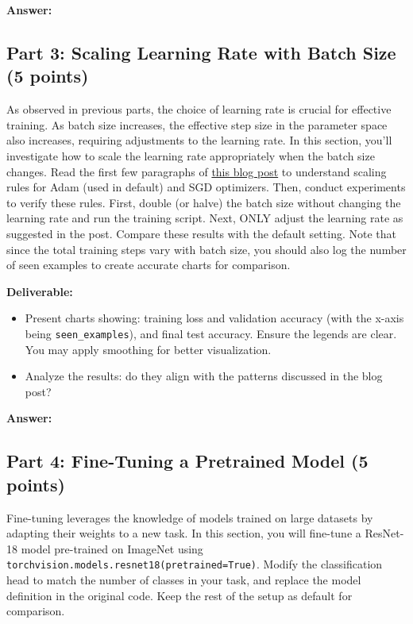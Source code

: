 \documentclass[11pt, oneside]{article}   	%
\begin{document}
\textbf{Answer:} \\



\subsection*{Part 3: Scaling Learning Rate with Batch Size (5 points)}

As observed in previous parts, the choice of learning rate is crucial for effective training. As batch size increases, the effective step size in the parameter space also increases, requiring adjustments to the learning rate. In this section, you'll investigate how to scale the learning rate appropriately when the batch size changes. Read the first few paragraphs of \href{https://www.cs.princeton.edu/~smalladi/blog/2024/01/22/SDEs-ScalingRules/}{this blog post} to understand scaling rules for Adam (used in default) and SGD optimizers. Then, conduct experiments to verify these rules. First, double (or halve) the batch size without changing the learning rate and run the training script. Next, ONLY adjust the learning rate as suggested in the post. Compare these results with the default setting. Note that since the total training steps vary with batch size, you should also log the number of seen examples to create accurate charts for comparison.


\noindent\textbf{Deliverable:}
\begin{itemize}
    \item Present charts showing: training loss and validation accuracy (with the x-axis being \texttt{seen\_examples}), and final test accuracy. Ensure the legends are clear. You may apply smoothing for better visualization. 
    \item Analyze the results: do they align with the patterns discussed in the blog post?
\end{itemize}

\textbf{Answer:} \\

\subsection*{Part 4: Fine-Tuning a Pretrained Model (5 points)}
Fine-tuning leverages the knowledge of models trained on large datasets by adapting their weights to a new task. In this section, you will fine-tune a ResNet-18 model pre-trained on ImageNet using \texttt{torchvision.models.resnet18(pretrained=True)}. Modify the classification head to match the number of classes in your task, and replace the model definition in the original code. Keep the rest of the setup as default for comparison.
\end{document}
